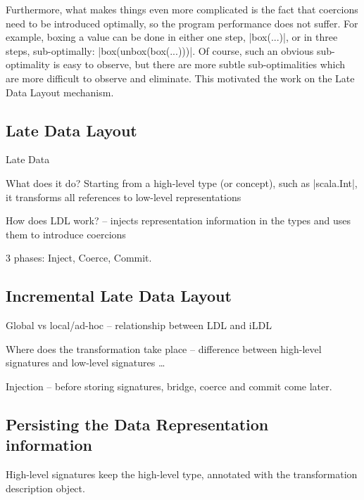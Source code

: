 Furthermore, what makes things even more complicated is the fact that coercions need to be introduced optimally, so the program performance does not suffer. For example, boxing a value can be done in either one step, |box(...)|, or in three steps, sub-optimally: |box(unbox(box(...)))|. Of course, such an obvious sub-optimality is easy to observe, but there are more subtle sub-optimalities which are more difficult to observe and eliminate. This motivated the work on the Late Data Layout mechanism.

\subsection {Late Data Layout}

Late Data

What does it do? Starting from a high-level type (or concept), such as |scala.Int|, it transforms all references to low-level representations

How does LDL work? -- injects representation information in the types and uses them to introduce coercions

3 phases: Inject, Coerce, Commit.




\subsection{Incremental Late Data Layout}

Global vs local/ad-hoc -- relationship between LDL and iLDL

Where does the transformation take place -- difference between high-level signatures and low-level signatures \ldots

Injection -- before storing signatures, bridge, coerce and commit come later.

\subsection{Persisting the Data Representation information}
\label{sec:ildl:signatures}

High-level signatures keep the high-level type, annotated with the transformation description object.

